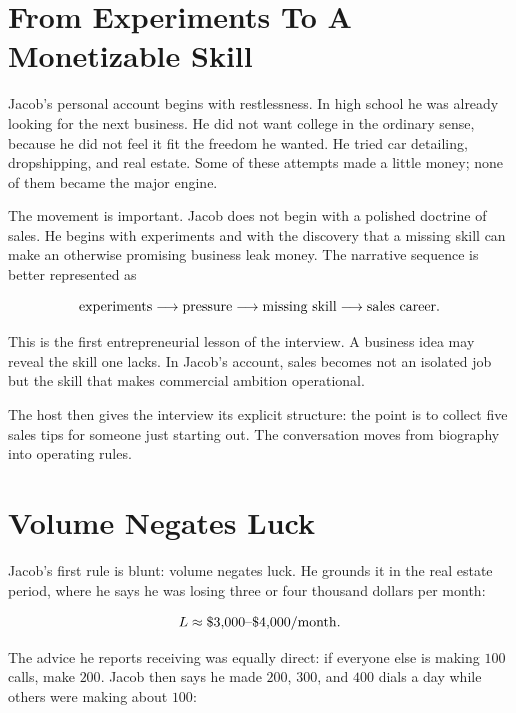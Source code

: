 \section{From Experiments To A Monetizable Skill}

Jacob's personal account begins with restlessness. In high school he was already looking for the next business. He did not want college in the ordinary sense, because he did not feel it fit the freedom he wanted. He tried car detailing, dropshipping, and real estate. Some of these attempts made a little money; none of them became the major engine.

The movement is important. Jacob does not begin with a polished doctrine of sales. He begins with experiments and with the discovery that a missing skill can make an otherwise promising business leak money. The narrative sequence is better represented as

\begin{equation}
\hbox{experiments}
\longrightarrow
\hbox{pressure}
\longrightarrow
\hbox{missing skill}
\longrightarrow
\hbox{sales career}.
\end{equation}

This is the first entrepreneurial lesson of the interview. A business idea may reveal the skill one lacks. In Jacob's account, sales becomes not an isolated job but the skill that makes commercial ambition operational.

The host then gives the interview its explicit structure: the point is to collect five sales tips for someone just starting out. The conversation moves from biography into operating rules.

\section{Volume Negates Luck}

Jacob's first rule is blunt: volume negates luck. He grounds it in the real estate period, where he says he was losing three or four thousand dollars per month:

\begin{equation}
L \approx \$3{,}000\hbox{--}\$4{,}000/\mathrm{month}.
\end{equation}

The advice he reports receiving was equally direct: if everyone else is making \(100\) calls, make \(200\). Jacob then says he made \(200\), \(300\), and \(400\) dials a day while others were making about \(100\):

